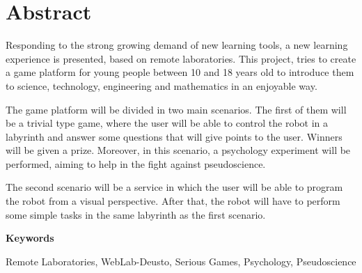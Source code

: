 \chapter*{Abstract}

Responding to the strong growing demand of new learning tools, a new learning experience is
presented, based on remote laboratories. This project, tries to create a game platform for young
people between 10 and 18 years old to introduce them to science, technology, engineering and
mathematics in an enjoyable way.

The game platform will be divided in two main scenarios. The first of them will be a trivial type
game, where the user will be able to control the robot in a labyrinth and answer some questions that
will give points to the user. Winners will be given a prize. Moreover, in this scenario, a
psychology experiment will be performed, aiming to help in the fight against pseudoscience.

The second scenario will be a service in which the user will be able to program the robot from a
visual perspective. After that, the robot will have to perform some simple tasks in the same
labyrinth as the first scenario.

\vspace{2em}

{\Large\bfseries\sectionfont Keywords}
\vspace{3\medskipamount}

Remote Laboratories, WebLab-Deusto, Serious Games, Psychology, Pseudoscience

